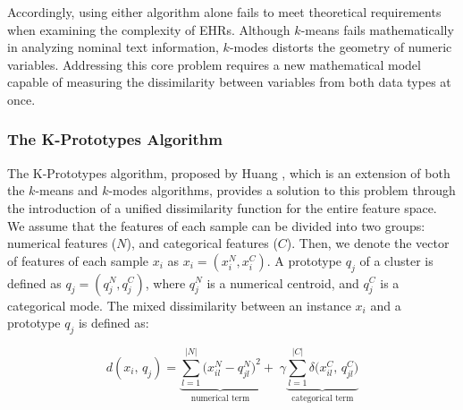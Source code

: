 Accordingly, using either algorithm alone fails to meet theoretical requirements when examining the complexity of EHRs. Although $k$-means fails mathematically in analyzing nominal text information, $k$-modes distorts the geometry of numeric variables. Addressing this core problem requires a new mathematical model capable of measuring the dissimilarity between variables from both data types at once.

\subsubsection*{The K-Prototypes Algorithm}

The K-Prototypes algorithm, proposed by Huang \cite{huang1998}, which is an extension of both the $k$-means and $k$-modes algorithms, provides a solution to this problem through the introduction of a unified dissimilarity function for the entire feature space. We assume that the features of each sample can be divided into two groups: numerical features ($N$), and categorical features ($C$). Then, we denote the vector of features of each sample $x_i$ as $x_i = (x_i^N, x_i^C)$. A prototype $q_j$ of a cluster is defined as $q_j = (q_j^N, q_j^C)$, where $q_j^N$ is a numerical centroid, and $q_j^C$ is a categorical mode. The mixed dissimilarity between an instance $x_i$ and a prototype $q_j$ is defined as:

\vspace{1em}

\begin{equation}
    d(x_i,\, q_j) = \underbrace{\sum_{l=1}^{|N|} \bigl(x_{il}^{N} - q_{jl}^{N}\bigr)^2}_{\text{numerical term}} + \;\gamma \underbrace{\sum_{l=1}^{|C|} \delta\bigl(x_{il}^{C},\, q_{jl}^{C}\bigr)}_{\text{categorical term}}
    \label{eq:kproto_dist}
\end{equation}

